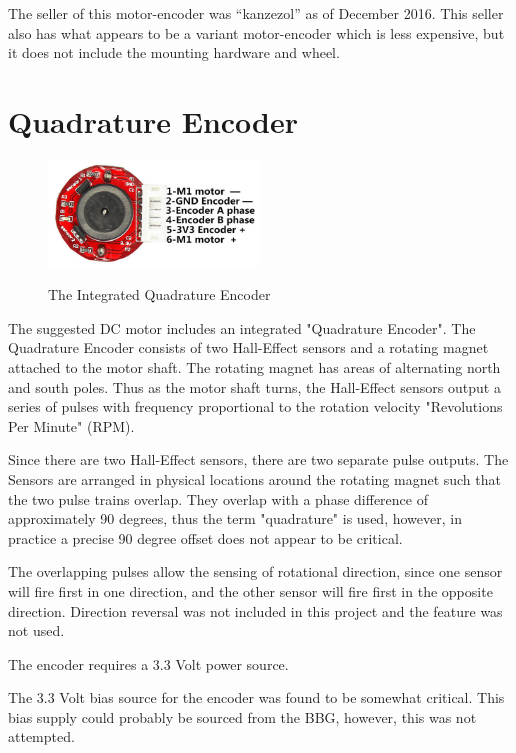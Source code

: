 The seller of this motor-encoder was ``kanzezol'' as of December 2016.  This seller also has what appears to be a variant motor-encoder which is less expensive, but it does not include the mounting hardware and wheel.

\section{Quadrature Encoder}

\begin{figure}[h]
	\centering
    \includegraphics[width=0.5\textwidth]{photos/encoder-close-view.jpg}
	\centering\bfseries
	\caption{The Integrated Quadrature Encoder}
\end{figure}

The suggested DC motor includes an integrated "Quadrature Encoder".  The Quadrature Encoder consists of two Hall-Effect sensors and a rotating magnet attached to the motor shaft.  The rotating magnet has areas of alternating north and south poles.  Thus as the motor shaft turns, the Hall-Effect sensors output a series of pulses with frequency proportional to the rotation velocity "Revolutions Per Minute" (RPM).

Since there are two Hall-Effect sensors, there are two separate pulse outputs.  The Sensors are arranged in physical locations around the rotating magnet such that the two pulse trains overlap.  They overlap with a phase difference of approximately 90 degrees, thus the term "quadrature" is used, however, in practice a precise 90 degree offset does not appear to be critical.

The overlapping pulses allow the sensing of rotational direction, since one sensor will fire first in one direction, and the other sensor will fire first in the opposite direction.  Direction reversal was not included in this project and the feature was not used.

The encoder requires a 3.3 Volt power source.

The 3.3 Volt bias source for the encoder was found to be somewhat critical.  This bias supply could probably be sourced from the BBG, however, this was not attempted.
